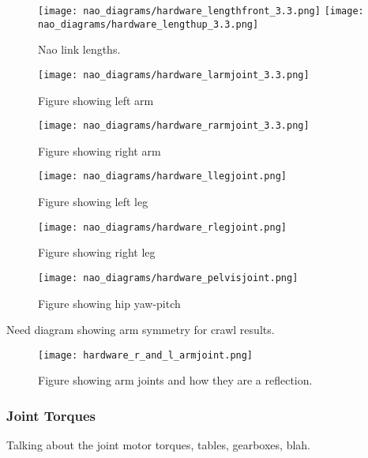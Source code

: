 \begin{figure}
\centerline{\texttt{[image: nao\_diagrams/hardware\_lengthfront\_3.3.png]}
            \texttt{[image: nao\_diagrams/hardware\_lengthup\_3.3.png]}
}
\caption{Nao link lengths.}
\label{fig:nao_link_lengths1}
\end{figure}

\begin{figure}
\centering
\texttt{[image: nao\_diagrams/hardware\_larmjoint\_3.3.png]}
\caption{Figure showing left arm}
\label{fig:nao_arm_joints_left1}
\end{figure}

\begin{figure}
\centering
\texttt{[image: nao\_diagrams/hardware\_rarmjoint\_3.3.png]}
\caption{Figure showing right arm}
\label{fig:nao_arm_joints_right1}
\end{figure}

\begin{figure}
\centering
\texttt{[image: nao\_diagrams/hardware\_llegjoint.png]}
\caption{Figure showing left leg}
\label{fig:nao_leg_joints_left1}
\end{figure}

\begin{figure}
\centering
\texttt{[image: nao\_diagrams/hardware\_rlegjoint.png]}
\caption{Figure showing right leg}
\label{fig:nao_leg_joints_right1}
\end{figure}

\begin{figure}
\centering
\texttt{[image: nao\_diagrams/hardware\_pelvisjoint.png]}
\caption{Figure showing hip yaw-pitch}
\label{fig:nao_hip_yawpitch1}
\end{figure}


Need diagram showing arm symmetry for crawl results. 
\begin{figure}
\centering
\texttt{[image: hardware\_r\_and\_l\_armjoint.png]}
\caption{Figure showing arm joints and how they are a reflection.}
\label{fig:nao_arm_joints_reflect1}
\end{figure}

\subsubsection{Joint Torques}
Talking about the joint motor torques, tables, gearboxes, blah.

